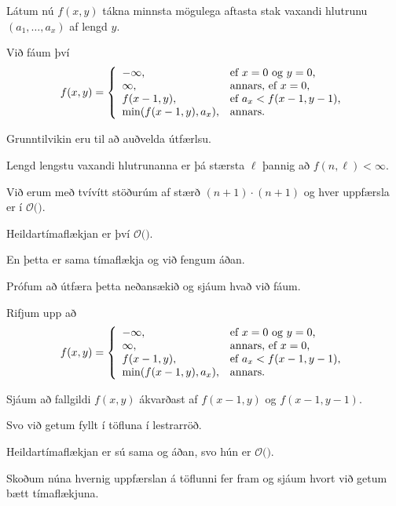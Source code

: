 {
	{
		\item<1-> Látum nú $f(x, y)$ tákna minnsta mögulega aftasta stak vaxandi hlutrunu $(a_1, \dots, a_x)$ af lengd $y$.
		\item<2-> Við fáum því
		\[
			f(x, y) = \left \{
			\env{array}
			{ {l l}
				-\infty, & \text{ef $x = 0$ og $y = 0$,} \\
				\infty, & \text{annars, ef $x = 0$,} \\
				f(x - 1, y), & \text{ef $a_x < f(x - 1, y - 1)$,} \\
				\min(f(x - 1, y), a_x), & \text{annars.}
			}
			\right .
		\]
		\item<3-> Grunntilvikin eru til að auðvelda útfærlsu.
		\item<4-> Lengd lengstu vaxandi hlutrunanna er þá stærsta $\ell$ þannig að $f(n, \ell) < \infty$.
	}
}

{
}

{
	{
		\item<1-> Við erum með tvívítt stöðurúm af stærð $(n + 1) \cdot (n + 1)$ og hver uppfærsla er í $\mathcal{O}($\onslide<2->{$\,1\,$}$)$.
		\item<3-> Heildartímaflækjan er því $\mathcal{O}($\onslide<4->{$n^2$}$)$.
		\item<5-> En þetta er sama tímaflækja og við fengum áðan.
		\item<6-> Prófum að útfæra þetta neðansækið og sjáum hvað við fáum.
	}
}

{
	{
		\item<1-> Rifjum upp að
		\[
			f(x, y) = \left \{
			\env{array}
			{ {l l}
				-\infty, & \text{ef $x = 0$ og $y = 0$,} \\
				\infty, & \text{annars, ef $x = 0$,} \\
				f(x - 1, y), & \text{ef $a_x < f(x - 1, y - 1)$,} \\
				\min(f(x - 1, y), a_x), & \text{annars.}
			}
			\right .
		\]
		\item<2-> Sjáum að fallgildi $f(x, y)$ ákvarðast af $f(x - 1, y)$ og $f(x - 1, y - 1)$.
		\item<3-> Svo við getum fyllt í töfluna í lestrarröð.
	}
}

{
}

{
	{
		\item<1-> Heildartímaflækjan er sú sama og áðan, svo hún er $\mathcal{O}($\onslide<2->{$n^2$}$)$.
		\item<3-> Skoðum núna hvernig uppfærslan á töflunni fer fram og sjáum hvort við getum bætt tímaflækjuna.
	}
}

